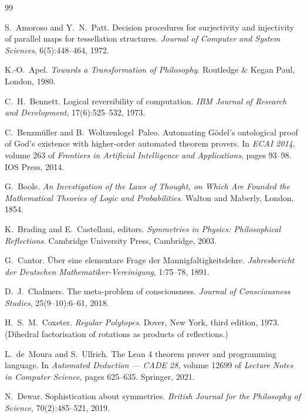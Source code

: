\documentclass[11pt,a4paper]{article}
\theoremstyle{plain}
\theoremstyle{definition}
\theoremstyle{remark}
\begin{document}
\begin{thebibliography}{99}

S.~Amoroso and Y.~N.~Patt.
\newblock Decision procedures for surjectivity and injectivity of
  parallel maps for tessellation structures.
\newblock \emph{Journal of Computer and System Sciences},
  6(5):448--464, 1972.

K.-O.~Apel.
\newblock \emph{Towards a Transformation of Philosophy}.
\newblock Routledge \& Kegan Paul, London, 1980.

C.~H.~Bennett.
\newblock Logical reversibility of computation.
\newblock \emph{IBM Journal of Research and Development}, 17(6):525--532,
  1973.

C.~Benzm\"uller and B.~Woltzenlogel~Paleo.
\newblock Automating G\"odel's ontological proof of God's existence with
  higher-order automated theorem provers.
\newblock In \emph{ECAI 2014}, volume 263 of \emph{Frontiers in
  Artificial Intelligence and Applications}, pages 93--98. IOS Press,
  2014.

G.~Boole.
\newblock \emph{An Investigation of the Laws of Thought, on Which Are
  Founded the Mathematical Theories of Logic and Probabilities}.
\newblock Walton and Maberly, London, 1854.

K.~Brading and E.~Castellani, editors.
\newblock \emph{Symmetries in Physics: Philosophical Reflections}.
\newblock Cambridge University Press, Cambridge, 2003.

G.~Cantor.
\newblock \"Uber eine elementare Frage der Mannigfaltigkeitslehre.
\newblock \emph{Jahresbericht der Deutschen Mathematiker-Vereinigung},
  1:75--78, 1891.

D.~J.~Chalmers.
\newblock The meta-problem of consciousness.
\newblock \emph{Journal of Consciousness Studies}, 25(9--10):6--61, 2018.

H.~S.~M.~Coxeter.
\newblock \emph{Regular Polytopes}.
\newblock Dover, New York, third edition, 1973.
\newblock (Dihedral factorisation of rotations as products of reflections.)

L.~de~Moura and S.~Ullrich.
\newblock The Lean 4 theorem prover and programming language.
\newblock In \emph{Automated Deduction --- CADE 28}, volume 12699 of
  \emph{Lecture Notes in Computer Science}, pages 625--635. Springer,
  2021.

N.~Dewar.
\newblock Sophistication about symmetries.
\newblock \emph{British Journal for the Philosophy of Science},
  70(2):485--521, 2019.


\end{thebibliography}
\end{document}
